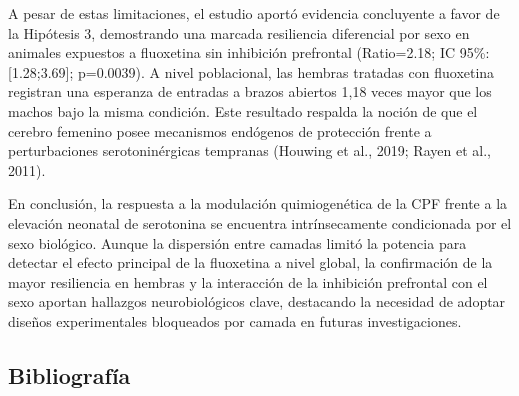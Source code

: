\documentclass[
  letterpaper,
  DIV=11,
  numbers=noendperiod]{scrartcl}
\begin{document}
A pesar de estas limitaciones, el estudio aportó evidencia concluyente a
favor de la Hipótesis 3, demostrando una marcada resiliencia diferencial
por sexo en animales expuestos a fluoxetina sin inhibición prefrontal
(Ratio=2.18; IC 95\%: {[}1.28;3.69{]}; p=0.0039). A nivel poblacional,
las hembras tratadas con fluoxetina registran una esperanza de entradas
a brazos abiertos 1,18 veces mayor que los machos bajo la misma
condición. Este resultado respalda la noción de que el cerebro femenino
posee mecanismos endógenos de protección frente a perturbaciones
serotoninérgicas tempranas (Houwing et al., 2019; Rayen et al., 2011).~

En conclusión, la respuesta a la modulación quimiogenética de la CPF
frente a la elevación neonatal de serotonina se encuentra
intrínsecamente condicionada por el sexo biológico. Aunque la dispersión
entre camadas limitó la potencia para detectar el efecto principal de la
fluoxetina a nivel global, la confirmación de la mayor resiliencia en
hembras y la interacción de la inhibición prefrontal con el sexo aportan
hallazgos neurobiológicos clave, destacando la necesidad de adoptar
diseños experimentales bloqueados por camada en futuras investigaciones.

\subsection{Bibliografía}\label{bibliografuxeda}
\end{document}
